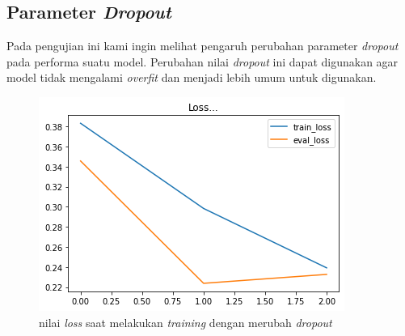 \subsection{Parameter \textit{Dropout}}

Pada pengujian ini kami ingin melihat pengaruh perubahan parameter \textit{dropout} pada performa suatu model. Perubahan nilai \textit{dropout} ini dapat digunakan agar model tidak mengalami \textit{overfit} dan menjadi lebih umum untuk digunakan.

\begin{figure}[h]
    \begin{center}
        \includegraphics[width= 0.9\linewidth]{gambar/loss_dropout_new.png}
        \caption{nilai \textit{loss} saat melakukan \textit{training} dengan merubah \textit{dropout}}
        \label{fig: loss_dropout}
    \end{center}
\end{figure}

